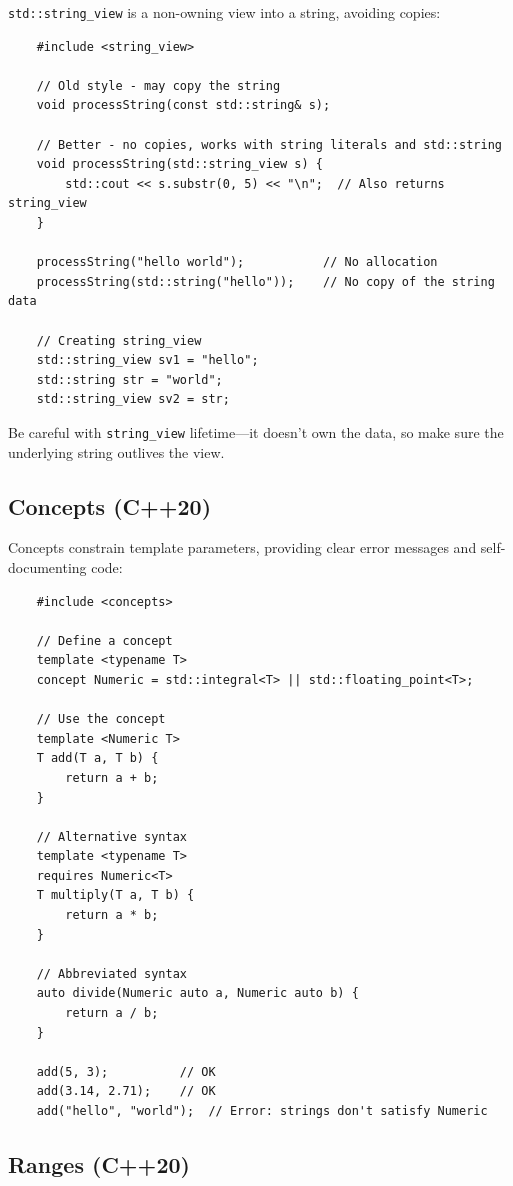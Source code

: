 \texttt{std::string\_view} is a non-owning view into a string, avoiding copies:

\begin{lstlisting}
	#include <string_view>
	
	// Old style - may copy the string
	void processString(const std::string& s);
	
	// Better - no copies, works with string literals and std::string
	void processString(std::string_view s) {
		std::cout << s.substr(0, 5) << "\n";  // Also returns string_view
	}
	
	processString("hello world");           // No allocation
	processString(std::string("hello"));    // No copy of the string data
	
	// Creating string_view
	std::string_view sv1 = "hello";
	std::string str = "world";
	std::string_view sv2 = str;
\end{lstlisting}

\begin{remark}
	Be careful with \texttt{string\_view} lifetime—it doesn't own the data, so make sure the underlying string outlives the view.
\end{remark}

\subsection{Concepts (C++20)}

Concepts constrain template parameters, providing clear error messages and self-documenting code:

\begin{lstlisting}
	#include <concepts>
	
	// Define a concept
	template <typename T>
	concept Numeric = std::integral<T> || std::floating_point<T>;
	
	// Use the concept
	template <Numeric T>
	T add(T a, T b) {
		return a + b;
	}
	
	// Alternative syntax
	template <typename T>
	requires Numeric<T>
	T multiply(T a, T b) {
		return a * b;
	}
	
	// Abbreviated syntax
	auto divide(Numeric auto a, Numeric auto b) {
		return a / b;
	}
	
	add(5, 3);          // OK
	add(3.14, 2.71);    // OK
	add("hello", "world");  // Error: strings don't satisfy Numeric
\end{lstlisting}

\subsection{Ranges (C++20)}

